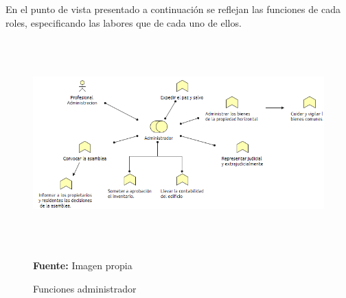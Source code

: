 En el punto de vista presentado a continuación se reflejan las funciones de cada roles, especificando las labores que de cada uno de ellos.

\begin{figure}[th!]
	\centering
	\includegraphics[width=13cm,height=8cm]{arquitectura/negocio/imgs/funciones-1}
	\caption{Funciones administrador}{\scriptsize \textbf{Fuente:} Imagen propia}
\end{figure}


